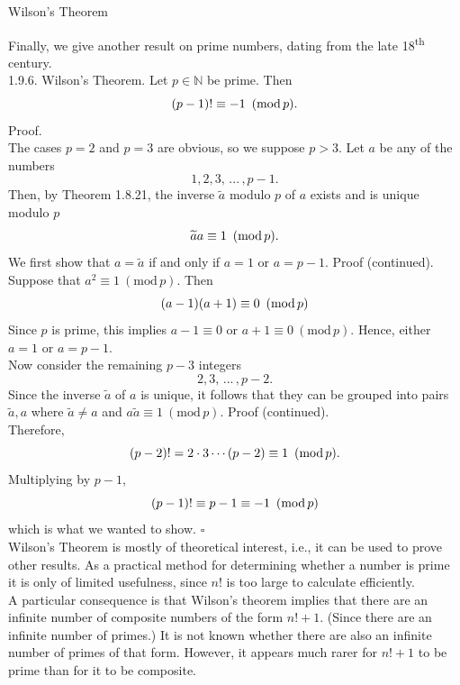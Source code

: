 \documentclass[smaller,hyperref={CJKbookmarks=true}]{beamer}
\newcommand{\N}{\mathbb{N}} \newcommand{\Z}{\mathbb{Z}} \newcommand{\Q}{\mathbb{Q}}
\newenvironment{PROOF}{{\noindent\!\sf\alert{Proof.}}\\}{\hfill$\square$\\}
\begin{document}
\begin{frame}{Wilson's Theorem}
\begin{spacing}{1.05}
Finally, we give another result on prime numbers, dating from the late 18\textsuperscript{th} century.\\[5pt]
\alert{1.9.6. Wilson's Theorem.} Let $p\in\N$ be prime. Then
\[(p-1)!\equiv-1\enskip(\text{mod}\,p).\]
\begin{PROOF}
The cases $p=2$ and $p=3$ are obvious, so we suppose $p>3$. Let $a$ be any of the numbers
\[1,2,3,\,...\,,p-1.\]
Then, by Theorem 1.8.21, the inverse $\widetilde{a}$ modulo $p$ of $a$ exists and is unique modulo $p$
\[\widetilde{a}a\equiv1\enskip(\text{mod}\,p).\]
We first show that $a=\widetilde{a}$ if and only if $a=1$ or $a=p-1$.
\newpage
\vspace*{6pt}
\alert{Proof (continued).}\\
Suppose that $a^2\equiv1\:(\text{mod}\,p)$. Then
\[(a-1)(a+1)\equiv0\enskip(\text{mod}\,p)\]
Since $p$ is prime, this implies $a-1\equiv0$ or $a+1\equiv0\:(\text{mod}\,p)$. Hence, either $a=1$ or $a=p-1$.\\[5pt]
Now consider the remaining $p-3$ integers
\[2,3,\,...\,,p-2.\]
Since the inverse $\widetilde{a}$ of $a$ is unique, it follows that they can be grouped into pairs $\widetilde{a},a$ where $\widetilde{a}\neq a$ and $a\widetilde{a}\equiv1\:(\text{mod}\,p)$.
\newpage
\vspace*{8pt}
\alert{Proof (continued).}\\[3.5pt]
Therefore,
\[(p-2)!=2\cdot3\cdots(p-2)\equiv1\enskip(\text{mod}\,p).\]
Multiplying by $p-1$,
\[(p-1)!\equiv p-1\equiv -1\enskip(\text{mod}\,p)\]
which is what we wanted to show.
\end{PROOF}
\newpage
\vspace*{8pt}
Wilson's Theorem is mostly of theoretical interest, i.e., it can be used to
prove other results. As a practical method for determining whether a
number is prime it is only of limited usefulness, since $n!$ is too large to
calculate efficiently.\\[5pt]
A particular consequence is that Wilson's theorem implies that there are
an infinite number of composite numbers of the form $n! + 1$. (Since there
are an infinite number of primes.) It is not known whether there are also
an infinite number of primes of that form. However, it appears much rarer
for $n! + 1$ to be prime than for it to be composite.
\end{spacing}
\end{frame}
\end{document}

